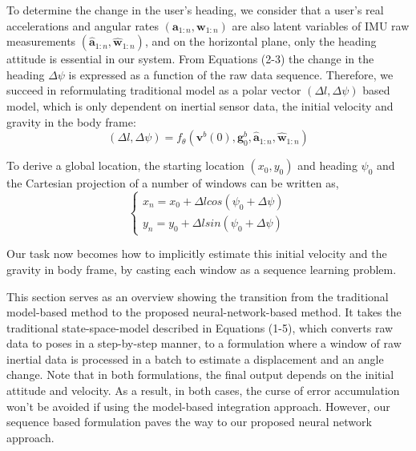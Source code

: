 \documentclass[letterpaper]{article}
\begin{document}
To determine the change in the user's heading, we consider that a user's real accelerations and angular rates $(\mathbf{a}_{1:n},\mathbf{w}_{1:n})$ are also latent variables of IMU raw measurements $(\mathbf{\hat{a}}_{1:n},\mathbf{\hat{w}}_{1:n})$, and on the horizontal plane, only the heading attitude is essential in our system. From Equations (2-3) the change in the heading $\Delta \psi$ is expressed as a function of the raw data sequence. Therefore, we succeed in reformulating traditional model as a polar vector $(\Delta l, \Delta \psi)$ based model, which is only dependent on inertial sensor data, the initial velocity and gravity in the body frame:  
    \begin{equation}
    	\label{eq:polar_vector}
    		(\Delta l, \Delta \psi)=f_{\theta}(\mathbf{v}^b(0), \mathbf{g}_0^b, \mathbf{\hat{a}}_{1:n}, \mathbf{\hat{w}}_{1:n})
    \end{equation}
    
To derive a global location, the starting location $(x_0, y_0)$ and heading $\psi_0$ and the Cartesian projection of a number of windows can be written as, 
     \begin{equation}
    	\left\{
    	\begin{aligned}
    		x_n=x_0+\Delta l cos(\psi_0+\Delta \psi) \\
        	y_n=y_0+\Delta l sin(\psi_0+\Delta \psi)
        \end{aligned}
       \right.
    \end{equation}
    

Our task now becomes how to implicitly estimate this initial velocity and the gravity in body frame, by casting each window as a sequence learning problem.

This section serves as an overview showing the transition from the traditional model-based method to the proposed neural-network-based method. It takes the traditional state-space-model described in Equations (1-5), which converts raw data to poses in a step-by-step manner, to a formulation where a window of raw inertial data is processed in a batch to estimate a displacement and an angle change. Note that in both formulations, the final output depends on the initial attitude and velocity. As a result, in both cases, the curse of error accumulation won't be avoided if using the model-based integration approach. However, our sequence based formulation paves the way to our proposed neural network approach. 
\end{document}

